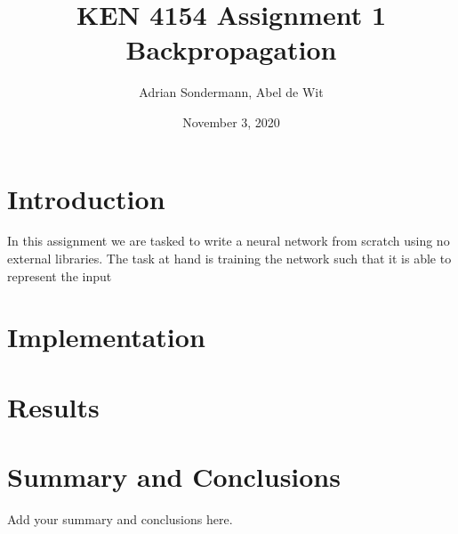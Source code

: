 \documentclass{article}
\title{\Large KEN 4154 Assignment 1 \\ \normalsize Backpropagation}
\author{Adrian Sondermann, Abel de Wit}
\date{November 3, 2020}
\begin{document}
\maketitle

\section{Introduction}
In this assignment we are tasked to write a neural network from scratch using no external libraries. The task at hand is training the network such that it is able to represent the input 

\section{Implementation}


\section{Results}

\section{Summary and Conclusions}
Add your summary and conclusions here.
\end{document}
